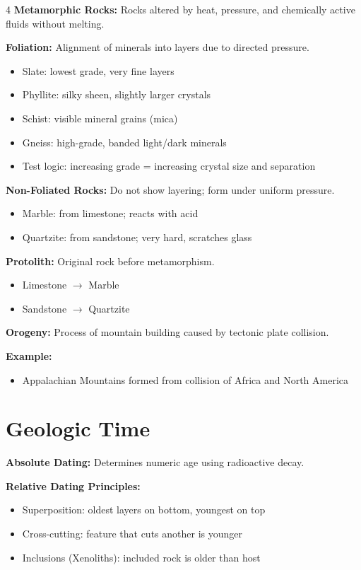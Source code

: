 \documentclass[10pt]{article}
\begin{document}
\begin{multicols}{4}
\textbf{Metamorphic Rocks:}
Rocks altered by heat, pressure, and chemically active fluids without melting.

\textbf{Foliation:}
Alignment of minerals into layers due to directed pressure.
\begin{itemize}
\item Slate: lowest grade, very fine layers
\item Phyllite: silky sheen, slightly larger crystals
\item Schist: visible mineral grains (mica)
\item Gneiss: high-grade, banded light/dark minerals
\item Test logic: increasing grade = increasing crystal size and separation
\end{itemize}

\textbf{Non-Foliated Rocks:}
Do not show layering; form under uniform pressure.
\begin{itemize}
\item Marble: from limestone; reacts with acid
\item Quartzite: from sandstone; very hard, scratches glass
\end{itemize}

\textbf{Protolith:}
Original rock before metamorphism.
\begin{itemize}
\item Limestone $\rightarrow$ Marble
\item Sandstone $\rightarrow$ Quartzite
\end{itemize}

\textbf{Orogeny:}
Process of mountain building caused by tectonic plate collision.

\textbf{Example:}
\begin{itemize}
\item Appalachian Mountains formed from collision of Africa and North America
\end{itemize}

\section*{Geologic Time}

\textbf{Absolute Dating:}
Determines numeric age using radioactive decay.

\textbf{Relative Dating Principles:}
\begin{itemize}
\item Superposition: oldest layers on bottom, youngest on top
\item Cross-cutting: feature that cuts another is younger
\item Inclusions (Xenoliths): included rock is older than host
\end{itemize}


\end{multicols}
\end{document}
